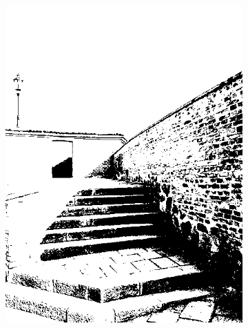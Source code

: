 \begin{figure}[t]
\begin{subfigure}{0.3\textwidth}
        \includegraphics[width=\textwidth]{figures/capturing/align/image1tb}
    \end{subfigure}


\end{figure}
